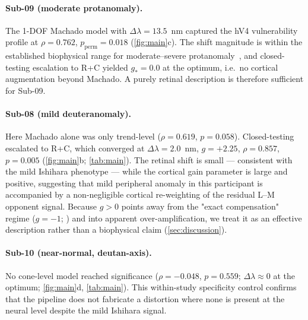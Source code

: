 \paragraph{Sub-09 (moderate protanomaly).}
The 1-DOF Machado model with $\Delta\lambda = 13.5$~nm captured the
hV4 vulnerability profile at $\rho = 0.762$,
$p_{\text{perm}} = 0.018$ (\cref{fig:main}c). The shift magnitude is
within the established biophysical range for moderate--severe
protanomaly~\citep{machado2009, neitz2011}, and closed-testing
escalation to R+C yielded $g_{\ast} = 0.0$ at the optimum, i.e.\ no
cortical augmentation beyond Machado. A purely retinal description is
therefore sufficient for Sub-09.

\paragraph{Sub-08 (mild deuteranomaly).}
Here Machado alone was only trend-level ($\rho = 0.619$,
$p = 0.058$). Closed-testing escalated to R+C, which converged at
$\Delta\lambda = 2.0$~nm, $g = +2.25$, $\rho = 0.857$,
$p = 0.005$ (\cref{fig:main}b; \cref{tab:main}). The retinal shift is
small --- consistent with the mild Ishihara phenotype --- while the
cortical gain parameter is large and positive, suggesting that mild
peripheral anomaly in this participant is accompanied by a
non-negligible cortical re-weighting of the residual L--M opponent
signal. Because $g > 0$ points away from the "exact compensation"
regime ($g = -1$; \citealp{tregillus2021}) and into apparent
over-amplification, we treat it as an effective description rather
than a biophysical claim (\cref{sec:discussion}).

\paragraph{Sub-10 (near-normal, deutan-axis).}
No cone-level model reached significance
($\rho = -0.048$, $p = 0.559$; $\Delta\lambda \approx 0$ at the
optimum; \cref{fig:main}d, \cref{tab:main}). This within-study
specificity control confirms that the pipeline does not fabricate a
distortion where none is present at the neural level despite the mild
Ishihara signal.

